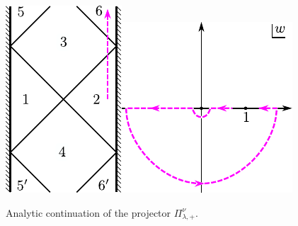 \documentclass[11pt]{article}
\begin{document}
\begin{figure}
\centerline{
\includegraphics{anacon_a}\hspace{2cm}\includegraphics{anacon_b}
}
\caption{Analytic continuation of the projector $\Pi^{\nu}_{\lambda,+}$.}
\label{fig_anacon}
\end{figure}
\end{document}
